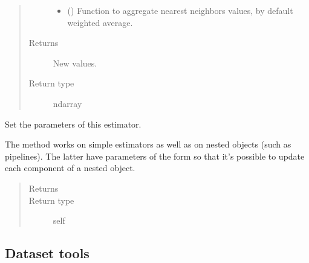 \documentclass[letterpaper,10pt,english]{sphinxmanual}
\begin{document}
\begin{fulllineitems}
\begin{fulllineitems}
\begin{quote}
\begin{description}
\begin{itemize}
\item {} 
 (\sphinxstyleliteralemphasis{\sphinxupquote{, }}) \textendash{} Function to aggregate nearest neighbors values, by default weighted average.

\end{itemize}

\item[{Returns}] \leavevmode
{} \textendash{} New values.

\item[{Return type}] \leavevmode
ndarray

\end{description}\end{quote}

\end{fulllineitems}


\begin{fulllineitems}
\label{\detokenize{api/properties_transfer:geology.models.PropertiesTransfer.set_params}}
Set the parameters of this estimator.

The method works on simple estimators as well as on nested objects
(such as pipelines). The latter have parameters of the form
 so that it’s possible to update each
component of a nested object.
\begin{quote}\begin{description}
\item[{Returns}] \leavevmode


\item[{Return type}] \leavevmode
self

\end{description}\end{quote}

\end{fulllineitems}


\end{fulllineitems}



\subsection{Dataset tools}
\label{\detokenize{api/dataset:dataset-tools}}\label{\detokenize{api/dataset::doc}}
\end{document}

